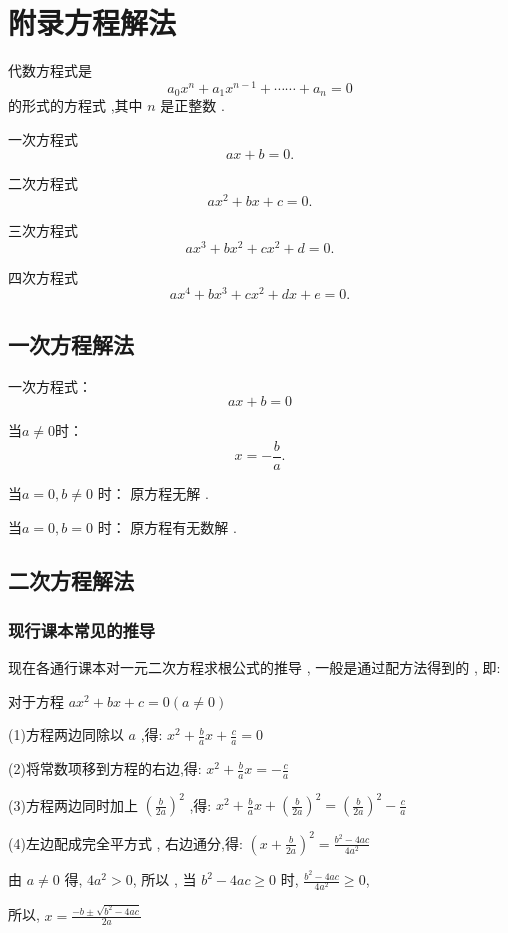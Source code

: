 \chapter{附录方程解法}

代数方程式是
\[
a_{0} x^{n}+a_{1} x^{n-1}+\cdots \cdots+a_{n}=0
\]
的形式的方程式 ,其中 $n$ 是正整数 .

一次方程式
\[
a x+b=0.
\]


二次方程式
\[
a x^{2}+b x+c=0.
\]


三次方程式
\[
a x^{3}+b x^{2}+c x^{2}+d=0.
\]

四次方程式
\[
a x^{4}+b x^{3}+c x^{2}+d x+e=0.
\]


\section{一次方程解法}

一次方程式：
\[
a x+b=0
\]

当$a \neq 0$时：
\[
x=-\dfrac{b}{a} . 
\]

当$ a = 0 , b \neq 0 $ 时：
原方程无解 . 


当$ a = 0 , b = 0 $ 时：
原方程有无数解 . 


\section{二次方程解法}

\subsection{现行课本常见的推导}
现在各通行课本对一元二次方程求根公式的推导 , 一般是通过配方法得到的 , 即:

对于方程 $ax^{2}+bx+c=0(a \neq 0)$

(1)方程两边同除以 $a$ ,得: $x^{2}+\frac{b}{a} x+\frac{c}{a}=0$

(2)将常数项移到方程的右边,得: $x^{2}+\frac{b}{a} x=-\frac{c}{a}$

(3)方程两边同时加上 $\left(\frac{b}{2 a}\right)^{2}$ ,得: 
$x^{2}+\frac{b}{a} x+\left(\frac{b}{2 a}\right)^{2}=\left(\frac{b}{2 a}\right)^{2}-\frac{c}{a}$

(4)左边配成完全平方式 , 右边通分,得:
$\left(x+\frac{b}{2 a}\right)^{2}=\frac{b^{2}-4 a c}{4 a^{2}}$

由 $a \neq 0$ 得, $4 a^{2}>0$, 
所以 , 当 $b^{2}-4 ac \geq 0$ 时, $\frac{b^{2}-4 a c}{4 a^{2}} \geq 0$,

所以, $x=\frac{-b \pm \sqrt{b^2-4 a c}}{2 a}$

